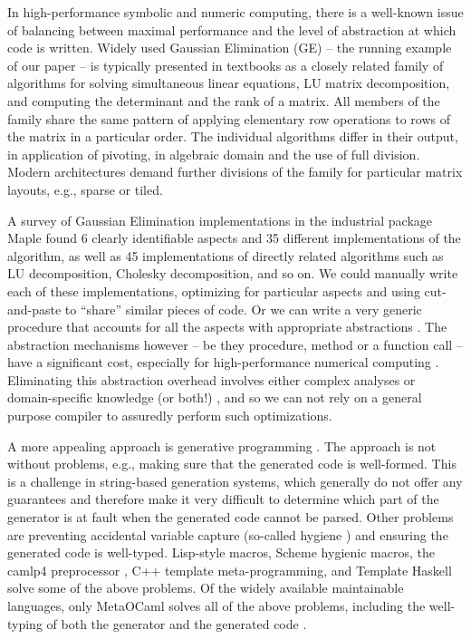 \documentclass{elsart}
\begin{document}
In high-performance symbolic and numeric computing, there is a
well-known issue of balancing between maximal performance and the
level of abstraction at which code is written. Widely used Gaussian
Elimination (GE) -- the running example of our paper -- is typically
presented in textbooks as a closely related family of algorithms for
solving simultaneous linear equations, LU matrix decomposition, and
computing the determinant and the rank of a matrix. All members of
the family share the same pattern of applying elementary row
operations to rows of the matrix in a particular order. The individual
algorithms differ in their output, in application of pivoting, in
algebraic domain and the use of full division. Modern architectures
demand further divisions of the family for particular matrix layouts, e.g.,
sparse or tiled.

A survey \cite{Carette06} of
Gaussian Elimination implementations in the industrial package Maple
\cite{Monagan:2001:M7P}
found 6 clearly identifiable aspects and 35 different implementations of the
algorithm, as well as 45 implementations of directly related
algorithms such as LU decomposition, Cholesky decomposition, and so on.  We
could manually write each of these implementations, optimizing for particular
aspects and using cut-and-paste to ``share'' similar pieces of code.
Or we can write a very generic procedure that accounts for
all the aspects with appropriate abstractions \cite{Gruntz:1994:IG,Axiom}. The
abstraction mechanisms however -- be they procedure, method or a
function call -- have a significant cost, especially for
high-performance numerical computing \cite{Carette06}. Eliminating
this abstraction overhead involves either complex analyses or
domain-specific knowledge (or both!)
\cite{Kennedy01Telescoping,Veldhuizen:2004,scp-CohenDGHKP06},
and so we can not rely on a general
purpose compiler to assuredly perform such optimizations.

A more appealing approach is generative programming
\cite{Czarnecki,Veldhuizen:1998:ISCOPE,musser89generic,musser94algorithmoriented,BOOST,POOMA,ATLAS}.
The approach is not without problems, e.g., making sure that the
generated code is well-formed. This is a challenge in string-based
generation systems, which generally do not offer any guarantees and
therefore make it very difficult to determine which part of the
generator is at fault when the generated code cannot be parsed. Other
problems are preventing accidental variable capture (so-called hygiene
\cite{HygienicMacros}) and ensuring the generated code is
well-typed. Lisp-style macros, Scheme hygienic macros, the camlp4
preprocessor \cite{camlp4}, C++ template meta-programming, and Template
Haskell \cite{conf/dagstuhl/CzarneckiOST03} solve some of the above
problems. Of the widely available maintainable languages, only
MetaOCaml \cite{CTHL03,metaocaml-org}  solves all of the above problems,
including the well-typing of both the generator and 
the generated code \cite{TahaSheard97,TahaThesis}.
\end{document}
